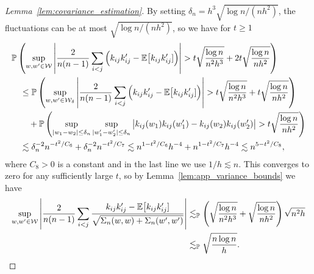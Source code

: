 \begin{proof}[Lemma~\ref{lem:covariance_estimation}]
  By setting
  $\delta_n = h^3\sqrt{\log n / (n h^2)}$,
  the fluctuations can be at most $\sqrt{\log n / (n h^2)}$,
  so we have for $t \geq 1$
  \begin{align*}
    &\mathbb{P}\left(
      \sup_{w,w' \in \mathcal{W}}
      \left|
      \frac{2}{n(n-1)}
      \sum_{i<j}
      \Big(
        k_{i j} k_{i j}'
        - \mathbb{E}\big[k_{i j} k_{i j}']
      \Big)
      \right|
      > t \sqrt{\frac{\log n}{n^2h^3}}
      + 2t \sqrt{\frac{\log n}{n h^2}}
    \right) \\
    &\quad\leq
    \mathbb{P}\left(
      \sup_{w,w' \in \mathcal{W}_\delta}
      \left|
      \frac{2}{n(n-1)}
      \sum_{i<j}
      \Big(
        k_{i j} k_{i j}'
        - \mathbb{E}\big[k_{i j} k_{i j}']
      \Big)
      \right|
      > t \sqrt{\frac{\log n}{n^2h^3}}
      + t \sqrt{\frac{\log n}{n h^2}}
    \right) \\
    &\qquad+
    \mathbb{P}\left(
      \sup_{|w_1-w_2| \leq \delta_n}
      \sup_{|w_1'-w_2'| \leq \delta_n}
      \big|
      k_{i j}(w_1)
      k_{i j}(w_1')
      - k_{i j}(w_2)
      k_{i j}(w_2')
      \big|
      > t \sqrt{\frac{\log n}{n h^2}}
    \right) \\
    &\quad\lesssim
    \delta_n^{-2} n^{-t^2 / C_6}
    + \delta_n^{-2} n^{-t^2 / C_7}
    \lesssim
    n^{1-t^2 / C_6} h^{-4}
    + n^{1-t^2 / C_7} h^{-4}
    \lesssim
    n^{5-t^2 / C_8},
  \end{align*}
  where $C_8 > 0$ is a constant and
  in the last line we use $1/h \lesssim n$.
  This converges to zero for any sufficiently large $t$,
  so by Lemma~\ref{lem:app_variance_bounds} we have
  \begin{align*}
    \sup_{w,w' \in \mathcal{W}}
    \left|
    \frac{2}{n(n-1)}
    \sum_{i<j}
    \frac{k_{i j} k_{i j}' - \mathbb{E}\big[k_{i j} k_{i j}']}
    {\sqrt{\Sigma_n(w,w) + \Sigma_n(w',w')}}
    \right|
    &\lesssim_{\mathbb{P}}
    \left(
      \sqrt{\frac{\log n}{n^2h^3}}
      + \sqrt{\frac{\log n}{n h^2}}
    \right)
    \sqrt{n^2h} \\
    &\lesssim_{\mathbb{P}}
    \sqrt{\frac{n \log n}{h}}.
  \end{align*}



\end{proof}
